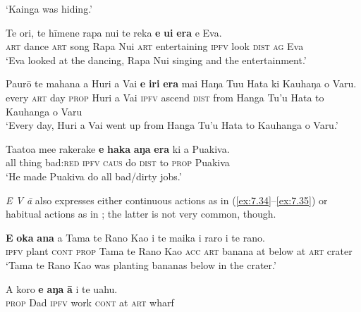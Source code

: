 \glt 
‘Kainga was hiding.’ \textstyleExampleref{[R304.093]} 
\z

\ea\label{ex:7.31}
\gll Te {\ꞌ}ori, te hīmene rapa nui te reka \textbf{e} \textbf{u{\ꞌ}i} \textbf{era} e Eva. \\
\textsc{art} dance \textsc{art} song Rapa Nui \textsc{art} entertaining \textsc{ipfv} look \textsc{dist} \textsc{ag} Eva \\

\glt 
‘Eva looked at the dancing, Rapa Nui singing and the entertainment.’ \textstyleExampleref{[R210.133]} 
\z

\ea\label{ex:7.32}
\gll Paurō te mahana a Huri {\ꞌ}a Vai \textbf{e} \textbf{iri} \textbf{era} mai Haŋa Tu{\ꞌ}u Hata ki Kauhaŋa o Varu.\\
every \textsc{art} day \textsc{prop} Huri a Vai \textsc{ipfv} ascend \textsc{dist} from Hanga Tu’u Hata to Kauhanga o Varu\\

\glt 
‘Every day, Huri a Vai went up from Hanga Tu’u Hata to Kauhanga o Varu.’ \textstyleExampleref{[R304.001]} 
\z

\ea\label{ex:7.33}
\gll Ta{\ꞌ}ato{\ꞌ}a me{\ꞌ}e rakerake \textbf{e} \textbf{haka} \textbf{aŋa} \textbf{era} ki a Puakiva. \\
all thing bad:\textsc{red} \textsc{ipfv} \textsc{caus} do \textsc{dist} to \textsc{prop} Puakiva \\

\glt 
‘He made Puakiva do all bad/dirty jobs.’ \textstyleExampleref{[R229.397]} 
\z

\textit{E V {\ꞌ}ā} also expresses either continuous actions as in (\ref{ex:7.34}–\ref{ex:7.35}) or habitual actions as in ; the latter is not very common, though.

\ea\label{ex:7.34}
\gll \textbf{E} \textbf{{\ꞌ}oka} \textbf{{\ꞌ}ana} a Tama te Rano Kao i te maika {\ꞌ}i raro i te rano. \\
\textsc{ipfv} plant \textsc{cont} \textsc{prop} Tama te Rano Kao \textsc{acc} \textsc{art} banana at below at \textsc{art} crater \\

\glt 
‘Tama te Rano Kao was planting bananas below in the crater.’ \textstyleExampleref{[Mtx-3-11.053]}
\z

\ea\label{ex:7.35}
\gll A koro \textbf{e} \textbf{aŋa} \textbf{{\ꞌ}ā} {\ꞌ}i te {\ꞌ}uahu. \\
\textsc{prop} Dad \textsc{ipfv} work \textsc{cont} at \textsc{art} wharf \\

